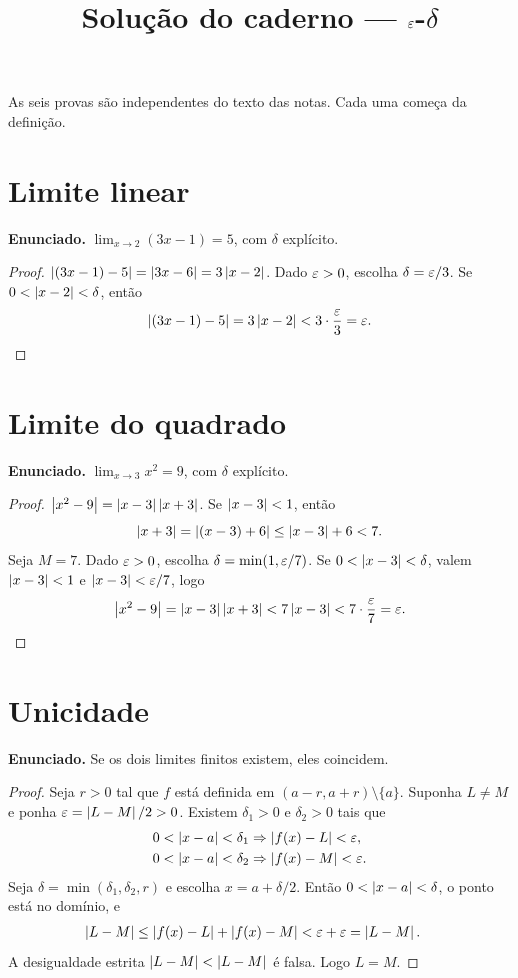 \documentclass[11pt,a4paper]{article}
\title{Solu\c{c}\~ao do caderno --- $\varepsilon$-$\delta$}
\author{}
\date{}
\begin{document}
\maketitle
\tableofcontents

As seis provas s\~ao independentes do texto das notas. Cada uma come\c{c}a da defini\c{c}\~ao.

\section{Limite linear}

\textbf{Enunciado.} $\lim_{x\to 2}(3x-1)=5$, com $\delta$ expl\'icito.

\begin{proof}
$\left\lvert (3x-1)-5 \right\rvert=\left\lvert 3x-6 \right\rvert=3\left\lvert x-2 \right\rvert$. Dado $\varepsilon>0$, escolha $\delta=\varepsilon/3$. Se $0<\left\lvert x-2 \right\rvert<\delta$, ent\~ao
\[
\left\lvert (3x-1)-5 \right\rvert=3\left\lvert x-2 \right\rvert<3\cdot\frac{\varepsilon}{3}=\varepsilon.
\]
\end{proof}

\section{Limite do quadrado}

\textbf{Enunciado.} $\lim_{x\to 3}x^2=9$, com $\delta$ expl\'icito.

\begin{proof}
$\left\lvert x^2-9 \right\rvert=\left\lvert x-3 \right\rvert\left\lvert x+3 \right\rvert$. Se $\left\lvert x-3 \right\rvert<1$, ent\~ao
\[
\left\lvert x+3 \right\rvert=\left\lvert (x-3)+6 \right\rvert\le \left\lvert x-3 \right\rvert+6<7.
\]
Seja $M=7$. Dado $\varepsilon>0$, escolha $\delta=\min(1,\varepsilon/7)$. Se $0<\left\lvert x-3 \right\rvert<\delta$, valem $\left\lvert x-3 \right\rvert<1$ e $\left\lvert x-3 \right\rvert<\varepsilon/7$, logo
\[
\left\lvert x^2-9 \right\rvert=\left\lvert x-3 \right\rvert\left\lvert x+3 \right\rvert<7\left\lvert x-3 \right\rvert<7\cdot\frac{\varepsilon}{7}=\varepsilon.
\]
\end{proof}

\section{Unicidade}

\textbf{Enunciado.} Se os dois limites finitos existem, eles coincidem.

\begin{proof}
Seja $r>0$ tal que $f$ est\'a definida em $(a-r,a+r)\setminus\{a\}$. Suponha $L\neq M$ e ponha $\varepsilon=\left\lvert L-M \right\rvert/2>0$. Existem $\delta_1>0$ e $\delta_2>0$ tais que
\begin{align*}
0<\left\lvert x-a \right\rvert<\delta_1 &\Rightarrow \left\lvert f(x)-L \right\rvert<\varepsilon,\\
0<\left\lvert x-a \right\rvert<\delta_2 &\Rightarrow \left\lvert f(x)-M \right\rvert<\varepsilon.
\end{align*}
Seja $\delta=\min(\delta_1,\delta_2,r)$ e escolha $x=a+\delta/2$. Ent\~ao $0<\left\lvert x-a \right\rvert<\delta$, o ponto est\'a no dom\'inio, e
\begin{align*}
\left\lvert L-M \right\rvert
&\le \left\lvert f(x)-L \right\rvert+\left\lvert f(x)-M \right\rvert
<\varepsilon+\varepsilon
=\left\lvert L-M \right\rvert.
\end{align*}
A desigualdade estrita $\left\lvert L-M \right\rvert<\left\lvert L-M \right\rvert$ \'e falsa. Logo $L=M$.
\end{proof}
\end{document}
